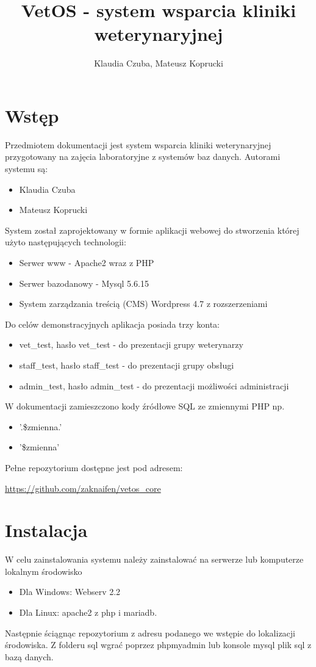 \documentclass[10pt,a4paper]{article}
\author{Klaudia Czuba, Mateusz Koprucki}
\title{VetOS - system wsparcia kliniki weterynaryjnej}
\date{}
\begin{document}
	
	\maketitle
	\newpage
	\tableofcontents
	\newpage
	
	\section{Wstęp}
	Przedmiotem dokumentacji jest system wsparcia kliniki weterynaryjnej przygotowany na zajęcia laboratoryjne z systemów baz danych. Autorami systemu są:
		\begin{itemize}
			\item Klaudia Czuba
			\item Mateusz Koprucki
		\end{itemize}
	System został zaprojektowany w formie aplikacji webowej do stworzenia której użyto następujących technologii:
		\begin{itemize}
			\item Serwer www - Apache2 wraz z PHP
			\item Serwer bazodanowy - Mysql 5.6.15
			\item System zarządzania treścią (CMS) Wordpress 4.7 z rozszerzeniami
		\end{itemize}
\newline
	Do celów demonstracyjnych aplikacja posiada trzy konta:
		\begin{itemize}
			\item vet\_test, hasło vet\_test - do prezentacji grupy weterynarzy
			\item staff\_test, hasło staff\_test - do prezentacji grupy obsługi
			\item admin\_test, hasło  admin\_test - do prezentacji możliwości administracji
		\end{itemize}
	W dokumentacji zamieszczono kody źródłowe SQL ze zmiennymi PHP np. 
	\begin{itemize}
		\item '.\$zmienna.'
		\item '\$zmienna'
	\end{itemize}
\newline		
		Pełne repozytorium dostępne jest pod adresem: 
	
	\url{https://github.com/zaknaifen/vetos_core}
	
	\section {Instalacja}
		W celu zainstalowania systemu należy zainstalować na serwerze lub komputerze lokalnym środowisko
		\begin{itemize}
			\item Dla Windows: Webserv 2.2
			\item Dla Linux: apache2 z php i mariadb.
		\end{itemize}
	Następnie ściągnąc repozytorium z adresu podanego we wstępie do lokalizacji środowiska. Z folderu sql wgrać poprzez phpmyadmin lub konsole mysql plik sql z bazą danych. 
	
\end{document}
